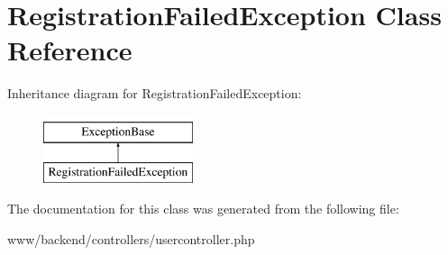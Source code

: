 \hypertarget{classRegistrationFailedException}{
\section{RegistrationFailedException Class Reference}
\label{classRegistrationFailedException}
}
Inheritance diagram for RegistrationFailedException:\begin{figure}[H]
\begin{center}
\leavevmode
\includegraphics[height=2.000000cm]{classRegistrationFailedException}
\end{center}
\end{figure}


The documentation for this class was generated from the following file:\begin{DoxyCompactItemize}
\item 
www/backend/controllers/usercontroller.php\end{DoxyCompactItemize}
